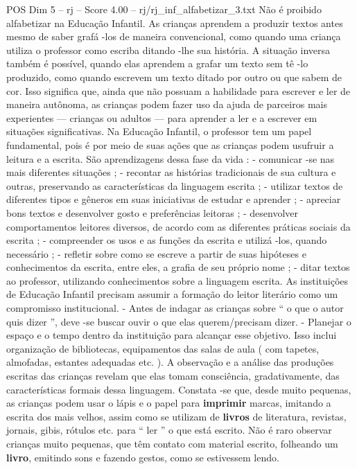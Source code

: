 \begin{textsample}{POS Dim 5 – rj – Score 4.00 – rj/rj\_inf\_alfabetizar\_3.txt}
Não é proibido alfabetizar na Educação Infantil.
As crianças aprendem a produzir textos antes mesmo de saber grafá -los de maneira convencional, como quando uma criança utiliza o professor como escriba ditando -lhe sua história.
A situação inversa também é possível, quando elas aprendem a grafar um texto sem tê -lo produzido, como quando escrevem um texto ditado por outro ou que sabem de cor.
Isso significa que, ainda que não possuam a habilidade para escrever e ler de maneira autônoma, as crianças podem fazer uso da ajuda de parceiros mais experientes — crianças ou adultos — para aprender a ler e a escrever em situações significativas.
Na Educação Infantil, o professor tem um papel fundamental, pois é por meio de suas ações que as crianças podem usufruir a leitura e a escrita.
São aprendizagens dessa fase da vida : - comunicar -se nas mais diferentes situações ; - recontar as histórias tradicionais de sua cultura e outras, preservando as características da linguagem escrita ; - utilizar textos de diferentes tipos e gêneros em suas iniciativas de estudar e aprender ; - apreciar bons textos e desenvolver gosto e preferências leitoras ; - desenvolver comportamentos leitores diversos, de acordo com as diferentes práticas sociais da escrita ; - compreender os usos e as funções da escrita e utilizá -los, quando necessário ; - refletir sobre como se escreve a partir de suas hipóteses e conhecimentos da escrita, entre eles, a grafia de seu próprio nome ; - ditar textos ao professor, utilizando conhecimentos sobre a linguagem escrita.
As instituições de Educação Infantil precisam assumir a formação do leitor literário como um compromisso institucional. - Antes de indagar as crianças sobre “ o que o autor quis dizer ”, deve -se buscar ouvir o que elas querem/precisam dizer. - Planejar o espaço e o tempo dentro da instituição para alcançar esse objetivo.
Isso inclui organização de bibliotecas, equipamentos das salas de aula ( com tapetes, almofadas, estantes adequadas etc. ).
A observação e a análise das produções escritas das crianças revelam que elas tomam consciência, gradativamente, das características formais dessa linguagem.
Constata -se que, desde muito pequenas, as crianças podem usar o lápis e o papel para \textbf{imprimir} marcas, imitando a escrita dos mais velhos, assim como se utilizam de \textbf{livros} de literatura, revistas, jornais, gibis, rótulos etc. para “ ler ” o que está escrito.
Não é raro observar crianças muito pequenas, que têm contato com material escrito, folheando um \textbf{livro}, emitindo sons e fazendo gestos, como se estivessem lendo.

\end{textsample}
